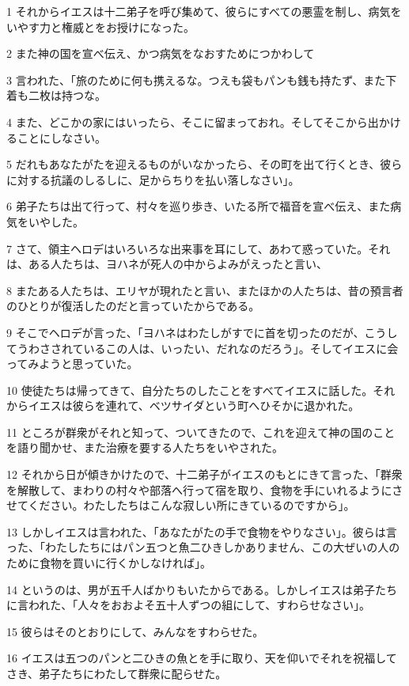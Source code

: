 \par 1 それからイエスは十二弟子を呼び集めて、彼らにすべての悪霊を制し、病気をいやす力と権威とをお授けになった。
\par 2 また神の国を宣べ伝え、かつ病気をなおすためにつかわして
\par 3 言われた、「旅のために何も携えるな。つえも袋もパンも銭も持たず、また下着も二枚は持つな。
\par 4 また、どこかの家にはいったら、そこに留まっておれ。そしてそこから出かけることにしなさい。
\par 5 だれもあなたがたを迎えるものがいなかったら、その町を出て行くとき、彼らに対する抗議のしるしに、足からちりを払い落しなさい」。
\par 6 弟子たちは出て行って、村々を巡り歩き、いたる所で福音を宣べ伝え、また病気をいやした。
\par 7 さて、領主ヘロデはいろいろな出来事を耳にして、あわて惑っていた。それは、ある人たちは、ヨハネが死人の中からよみがえったと言い、
\par 8 またある人たちは、エリヤが現れたと言い、またほかの人たちは、昔の預言者のひとりが復活したのだと言っていたからである。
\par 9 そこでヘロデが言った、「ヨハネはわたしがすでに首を切ったのだが、こうしてうわさされているこの人は、いったい、だれなのだろう」。そしてイエスに会ってみようと思っていた。
\par 10 使徒たちは帰ってきて、自分たちのしたことをすべてイエスに話した。それからイエスは彼らを連れて、ベツサイダという町へひそかに退かれた。
\par 11 ところが群衆がそれと知って、ついてきたので、これを迎えて神の国のことを語り聞かせ、また治療を要する人たちをいやされた。
\par 12 それから日が傾きかけたので、十二弟子がイエスのもとにきて言った、「群衆を解散して、まわりの村々や部落へ行って宿を取り、食物を手にいれるようにさせてください。わたしたちはこんな寂しい所にきているのですから」。
\par 13 しかしイエスは言われた、「あなたがたの手で食物をやりなさい」。彼らは言った、「わたしたちにはパン五つと魚二ひきしかありません、この大ぜいの人のために食物を買いに行くかしなければ」。
\par 14 というのは、男が五千人ばかりもいたからである。しかしイエスは弟子たちに言われた、「人々をおおよそ五十人ずつの組にして、すわらせなさい」。
\par 15 彼らはそのとおりにして、みんなをすわらせた。
\par 16 イエスは五つのパンと二ひきの魚とを手に取り、天を仰いでそれを祝福してさき、弟子たちにわたして群衆に配らせた。
